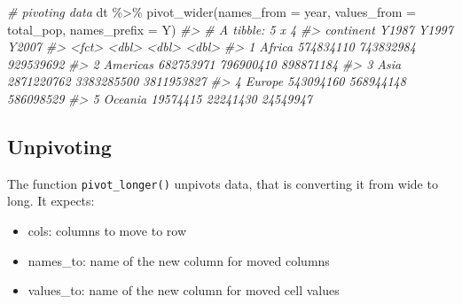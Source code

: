 \documentclass[
]{book}
\newenvironment{Shaded}{\begin{snugshade}}{\end{snugshade}}
\newcommand{\AttributeTok}[1]{\textcolor[rgb]{0.77,0.63,0.00}{#1}}
\newcommand{\CommentTok}[1]{\textcolor[rgb]{0.56,0.35,0.01}{\textit{#1}}}
\newcommand{\FunctionTok}[1]{\textcolor[rgb]{0.00,0.00,0.00}{#1}}
\newcommand{\NormalTok}[1]{#1}
\newcommand{\SpecialCharTok}[1]{\textcolor[rgb]{0.00,0.00,0.00}{#1}}
\newcommand{\StringTok}[1]{\textcolor[rgb]{0.31,0.60,0.02}{#1}}
\providecommand{\tightlist}{%
  \setlength{\itemsep}{0pt}\setlength{\parskip}{0pt}}
\begin{document}
\begin{Shaded}
\begin{Highlighting}[]
\CommentTok{\# pivoting data}
\NormalTok{dt }\SpecialCharTok{\%\textgreater{}\%}
  \FunctionTok{pivot\_wider}\NormalTok{(}\AttributeTok{names\_from =}\NormalTok{ year, }\AttributeTok{values\_from =}\NormalTok{ total\_pop, }\AttributeTok{names\_prefix =} \StringTok{\textquotesingle{}Y\textquotesingle{}}\NormalTok{)}
\CommentTok{\#\textgreater{} \# A tibble: 5 x 4}
\CommentTok{\#\textgreater{}   continent      Y1987      Y1997      Y2007}
\CommentTok{\#\textgreater{}   \textless{}fct\textgreater{}          \textless{}dbl\textgreater{}      \textless{}dbl\textgreater{}      \textless{}dbl\textgreater{}}
\CommentTok{\#\textgreater{} 1 Africa     574834110  743832984  929539692}
\CommentTok{\#\textgreater{} 2 Americas   682753971  796900410  898871184}
\CommentTok{\#\textgreater{} 3 Asia      2871220762 3383285500 3811953827}
\CommentTok{\#\textgreater{} 4 Europe     543094160  568944148  586098529}
\CommentTok{\#\textgreater{} 5 Oceania     19574415   22241430   24549947}
\end{Highlighting}
\end{Shaded}

\hypertarget{unpivoting-1}{%
\subsection{Unpivoting}\label{unpivoting-1}}

The function \texttt{pivot\_longer()} unpivots data, that is converting it from wide to long. It expects:

\begin{itemize}
\tightlist
\item
  cols: columns to move to row
\item
  names\_to: name of the new column for moved columns
\item
  values\_to: name of the new column for moved cell values
\end{itemize}
\end{document}
